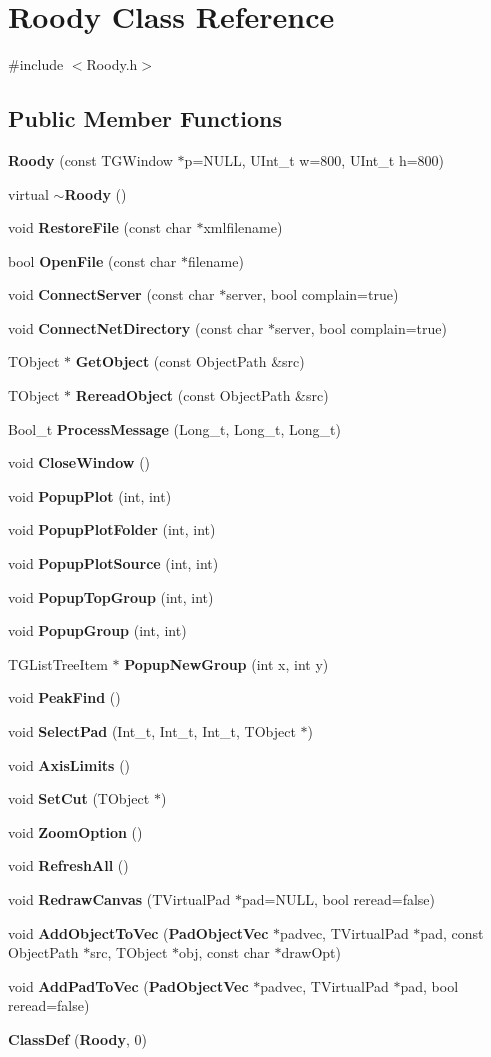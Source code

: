 \section{Roody Class Reference}
\label{classRoody}


{\ttfamily \#include $<$Roody.h$>$}

\subsection*{Public Member Functions}
\begin{DoxyCompactItemize}
\item 
{\bf Roody} (const TGWindow $\ast$p=NULL, UInt\_\-t w=800, UInt\_\-t h=800)
\item 
virtual {\bf $\sim$Roody} ()
\item 
void {\bf RestoreFile} (const char $\ast$xmlfilename)
\item 
bool {\bf OpenFile} (const char $\ast$filename)
\item 
void {\bf ConnectServer} (const char $\ast$server, bool complain=true)
\item 
void {\bf ConnectNetDirectory} (const char $\ast$server, bool complain=true)
\item 
TObject $\ast$ {\bf GetObject} (const ObjectPath \&src)
\item 
TObject $\ast$ {\bf RereadObject} (const ObjectPath \&src)
\item 
Bool\_\-t {\bf ProcessMessage} (Long\_\-t, Long\_\-t, Long\_\-t)
\item 
void {\bf CloseWindow} ()
\item 
void {\bf PopupPlot} (int, int)
\item 
void {\bf PopupPlotFolder} (int, int)
\item 
void {\bf PopupPlotSource} (int, int)
\item 
void {\bf PopupTopGroup} (int, int)
\item 
void {\bf PopupGroup} (int, int)
\item 
TGListTreeItem $\ast$ {\bf PopupNewGroup} (int x, int y)
\item 
void {\bf PeakFind} ()
\item 
void {\bf SelectPad} (Int\_\-t, Int\_\-t, Int\_\-t, TObject $\ast$)
\item 
void {\bf AxisLimits} ()
\item 
void {\bf SetCut} (TObject $\ast$)
\item 
void {\bf ZoomOption} ()
\item 
void {\bf RefreshAll} ()
\item 
void {\bf RedrawCanvas} (TVirtualPad $\ast$pad=NULL, bool reread=false)
\item 
void {\bf AddObjectToVec} ({\bf PadObjectVec} $\ast$padvec, TVirtualPad $\ast$pad, const ObjectPath $\ast$src, TObject $\ast$obj, const char $\ast$drawOpt)
\item 
void {\bf AddPadToVec} ({\bf PadObjectVec} $\ast$padvec, TVirtualPad $\ast$pad, bool reread=false)
\item 
{\bf ClassDef} ({\bf Roody}, 0)
\end{DoxyCompactItemize}
